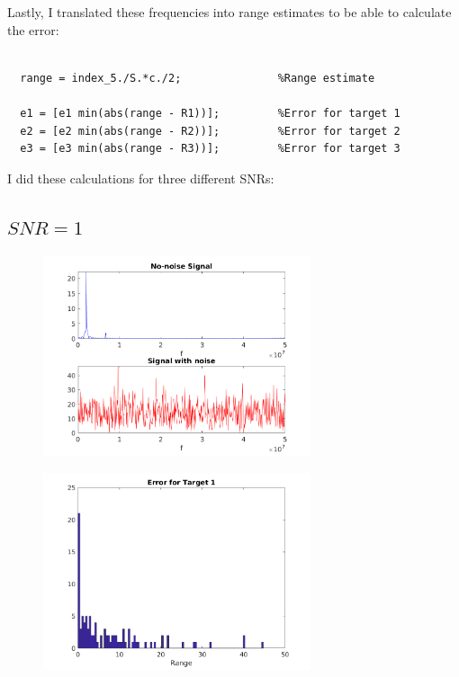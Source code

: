 \documentclass[a4paper,11pt]{article}
\begin{document}
Lastly, I translated these frequencies into range estimates to be able to
calculate the error:

\bigskip
\begin{lstlisting}

  range = index_5./S.*c./2;               %Range estimate

  e1 = [e1 min(abs(range - R1))];         %Error for target 1
  e2 = [e2 min(abs(range - R2))];         %Error for target 2
  e3 = [e3 min(abs(range - R3))];         %Error for target 3

\end{lstlisting}
\bigskip

I did these calculations for three different SNRs:

\newpage

\subsection{$SNR = 1$}

\begin{figure}[!hp]
    \begin{center}
      \includegraphics[width=0.7\textwidth]{images/signals_1.png}
    \end{center}
\end{figure}

\begin{figure}[!hp]
    \begin{center}
      \includegraphics[width=0.7\textwidth]{images/hist_e1_1.png}
    \end{center}
\end{figure}
\end{document}
